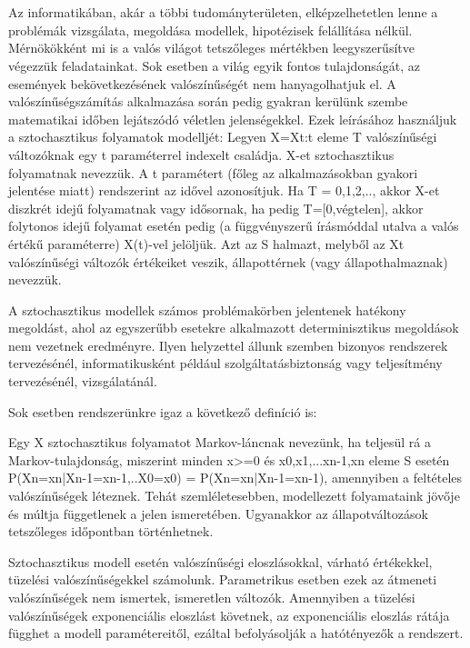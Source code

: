 \chapter{\bevezetes}

Az informatikában, akár a többi tudományterületen, elképzelhetetlen lenne a problémák vizsgálata, megoldása modellek, hipotézisek felállítása nélkül. Mérnökökként mi is a valós világot tetszőleges mértékben leegyszerűsítve végezzük feladatainkat. Sok esetben a világ egyik fontos tulajdonságát, az események bekövetkezésének valószínűségét nem hanyagolhatjuk el. A valószínűségszámítás alkalmazása során pedig gyakran kerülünk szembe matematikai időben lejátszódó véletlen jelenségekkel. Ezek leírásához használjuk a sztochasztikus folyamatok modelljét:
Legyen X={Xt:t eleme T} valószínűségi változóknak egy t paraméterrel indexelt családja. X-et sztochasztikus folyamatnak nevezzük. A t paramétert (főleg az alkalmazásokban gyakori jelentése miatt) rendszerint az idővel azonosítjuk. Ha T = {0,1,2,..}, akkor X-et diszkrét idejű folyamatnak vagy idősornak, ha pedig T=[0,végtelen], akkor folytonos idejű folyamat esetén pedig (a függvényszerű írásmóddal utalva a valós értékű paraméterre) X(t)-vel jelöljük. Azt az S halmazt, melyből az Xt valószínűségi változók értékeiket veszik, állapottérnek (vagy állapothalmaznak) nevezzük.

A sztochasztikus modellek számos problémakörben jelentenek hatékony megoldást, ahol az egyszerűbb esetekre alkalmazott determinisztikus megoldások nem vezetnek eredményre.
Ilyen helyzettel állunk szemben bizonyos rendszerek tervezésénél, informatikusként például szolgáltatásbiztonság vagy teljesítmény tervezésénél, vizsgálatánál.

Sok esetben rendszerünkre igaz a következő definíció is:

Egy X sztochasztikus folyamatot Markov-láncnak nevezünk, ha teljesül rá a Markov-tulajdonság, miszerint minden x>=0 és x0,x1,...xn-1,xn eleme S esetén
P(Xn=xn|Xn-1=xn-1,..X0=x0) = P(Xn=xn|Xn-1=xn-1), amennyiben a feltételes valószínűségek léteznek.\cite{MarkovLancokKonyv}
Tehát szemléletesebben, modellezett folyamataink jövője és múltja függetlenek a jelen ismeretében. Ugyanakkor az állapotváltozások tetszőleges időpontban történhetnek.

Sztochasztikus modell esetén valószínűségi eloszlásokkal, várható értékekkel, tüzelési valószínűségekkel számolunk. Parametrikus esetben ezek az átmeneti valószínűségek nem ismertek, ismeretlen változók. Amennyiben a  tüzelési valószínűségek exponenciális eloszlást követnek, az exponenciális eloszlás rátája függhet a modell paramétereitől, ezáltal befolyásolják a hatótényezők a rendszert.

